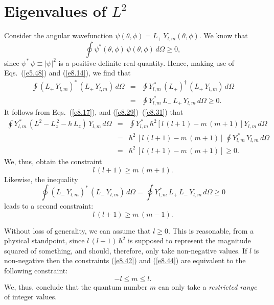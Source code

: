 \section{Eigenvalues of $L^2$}\label{slsq}
Consider the angular wavefunction $\psi(\theta,\phi) = L_+\,Y_{l,m}(\theta,\phi)$. We know that
\begin{equation}
\oint \psi^\ast(\theta,\phi)\,\psi(\theta,\phi)\,d\Omega \geq 0,
\end{equation}
since $\psi^\ast\,\psi\equiv |\psi|^2$ is a positive-definite real quantity.
Hence, making use of Eqs.~(\ref{e5.48}) and (\ref{e8.14}), we find that
\begin{eqnarray}
\oint (L_+\,Y_{l,m})^\ast\,(L_+\,Y_{l,m})\,d\Omega
&=& \oint Y_{l,m}^{\,\ast}\,(L_+)^\dag\,(L_+\,Y_{l,m})\,d\Omega\nonumber\\[0.5ex]
&=& \oint Y_{l,m}^{\,\ast}\,L_-\,L_+\,Y_{l,m}\,d\Omega\geq 0.
\end{eqnarray}
It follows from Eqs.~(\ref{e8.17}), and (\ref{e8.29})--(\ref{e8.31}) that
\begin{eqnarray}
\oint Y_{l,m}^{\,\ast}\,(L^2 -L_z^{\,2}-\hbar\,L_z)\,Y_{l,m}\,d\Omega
&=& \oint Y_{l,m}^{\,\ast}\,\hbar^2\left[l\,(l+1) -m\,(m+1)\right]Y_{l,m}\,d\Omega\nonumber\\[0.5ex]
&=& \hbar^2\,\left[l\,(l+1) -m\,(m+1)\right]\,\oint Y_{l,m}^{\,\ast}\,Y_{l,m}\,d\Omega\nonumber\\[0.5ex]
&=&\hbar^2\,\left[l\,(l+1) -m\,(m+1)\right]\geq 0.
\end{eqnarray}
We, thus, obtain the constraint
\begin{equation}\label{e8.42}
l\,(l+1) \geq m\,(m+1).
\end{equation}
Likewise, the inequality
\begin{equation}
\oint (L_-\,Y_{l,m})^\ast\,(L_-\,Y_{l,m})\,d\Omega
=\oint Y_{l,m}^{\,\ast}\,L_+\,L_-\,Y_{l,m}\,d\Omega\geq 0
\end{equation}
leads to a second constraint: 
\begin{equation}\label{e8.44}
l\,(l+1) \geq m\,(m-1).
\end{equation}

Without loss of generality, we can assume that $l\geq 0$. This
is reasonable, from a physical standpoint, since $l\,(l+1)\,\hbar^2$
is supposed to represent the magnitude squared of something, and
should, therefore, only take non-negative values. If $l$ is non-negative 
then the constraints (\ref{e8.42})  and (\ref{e8.44}) are equivalent
to the following constraint:
\begin{equation}
-l \leq m \leq l.
\end{equation}
We, thus, conclude that the quantum number $m$ can only take a {\em restricted range}\/ of integer values.


